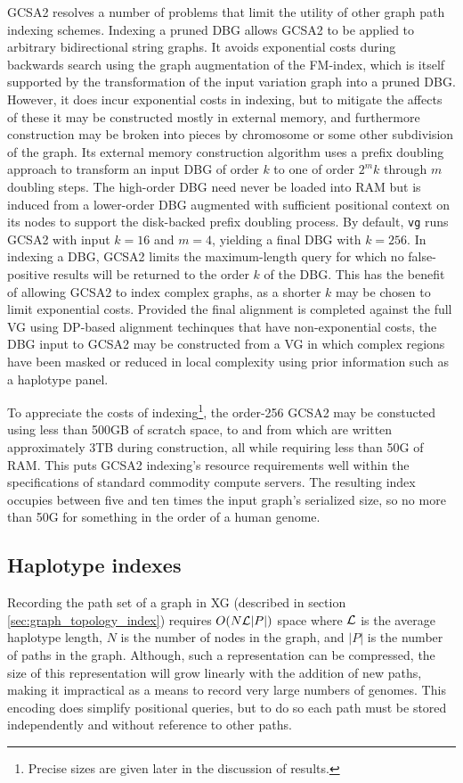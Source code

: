 GCSA2 resolves a number of problems that limit the utility of other graph path indexing schemes.
Indexing a pruned DBG allows GCSA2 to be applied to arbitrary bidirectional string graphs.
It avoids exponential costs during backwards search using the graph augmentation of the FM-index, which is itself supported by the transformation of the input variation graph into a pruned DBG.
However, it does incur exponential costs in indexing, but to mitigate the affects of these it may be constructed mostly in external memory, and furthermore construction may be broken into pieces by chromosome or some other subdivision of the graph.
Its external memory construction algorithm uses a prefix doubling approach to transform an input DBG of order $k$ to one of order $2^mk$ through $m$ doubling steps.
The high-order DBG need never be loaded into RAM but is induced from a lower-order DBG augmented with sufficient positional context on its nodes to support the disk-backed prefix doubling process.
By default, {\tt vg} runs GCSA2 with input $k=16$ and $m=4$, yielding a final DBG with $k=256$.
In indexing a DBG, GCSA2 limits the maximum-length query for which no false-positive results will be returned to the order $k$ of the DBG.
This has the benefit of allowing GCSA2 to index complex graphs, as a shorter $k$ may be chosen to limit exponential costs.
Provided the final alignment is completed against the full VG using DP-based alignment techinques that have non-exponential costs, the DBG input to GCSA2 may be constructed from a VG in which complex regions have been masked or reduced in local complexity using prior information such as a haplotype panel.

To appreciate the costs of indexing\footnote{Precise sizes are given later in the discussion of results.}, the order-256 GCSA2 may be constucted using less than 500GB of scratch space, to and from which are written approximately 3TB during construction, all while requiring less than 50G of RAM.
This puts GCSA2 indexing's resource requirements well within the specifications of standard commodity compute servers.
The resulting index occupies between five and ten times the input graph's serialized size, so no more than 50G for something in the order of a human genome.

\subsection{Haplotype indexes}
Recording the path set of a graph in XG (described in section \ref{sec:graph_topology_index}) requires $O(N{\cal L}|P|)$ space where ${\cal L}$ is the average haplotype length, $N$ is the number of nodes in the graph, and $|P|$ is the number of paths in the graph.
Although, such a representation can be compressed, the size of this representation will grow linearly with the addition of new paths, making it impractical as a means to record very large numbers of genomes.
This encoding does simplify positional queries, but to do so each path must be stored independently and without reference to other paths.

